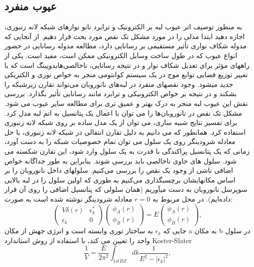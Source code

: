\subsection{عیوب منفرد} 
به منظور توصیف اثر عیوب لبه بر الکترونیک و ترابرد نانو نوارهای شبکه لانه زنبوری، اجازه دهید ابتدا مدلی را در مورد مشکل تک نقص مورد بحث قرار دهیم. از آنجایی که مدوله \gls{شکاف نواری} تأثیر مستقیمی بر رسانایی دارد، مطالعه مدوله رسانایی در حضور انواع عیوب که در طول ساخت وسایل الکترونیکی ممکن است، مفید است. یکی از راههای مؤثر برای تعدیل شکاف نوار و در نتیجه رسانایی، ناخالصی‌های\gls{دوپینگ} است که با تغییر توزیع فضایی توابع موج در یک سیستم کوانتومی منجر به خواص نوری و الکتریکی جدید میشود. وجود نقصهای منفرد در لبه‌های نانوروبان می‌تواند تقارن زیرشبکه را بشکند و در نتیجه بر خواص الکترونیکی و ترابرد مانند رسانایی تأثیر بگذارد. بررسی نقش این عیوب لبه منجر به درک بهتر و عمیق تری برای مطالعه سایر عیوب می شود. مشکل تک نقص در نانوروبان‌ها را می توان با اعمال یک پتانسیل به اتم لبه مدل کرد. برای تفسیر نتایج شبیه سازی، می توان از یک مدل ساده بر روی شبکه لانه زنبوری استفاده کرد. همانطور که می دانیم به دلیل تقارن انتقالی در شبکه لانه زنبوری، با حل معادله شرودینگر روی یک سلول می توان تمام خصوصیات شبکه را به دست آورد، زمانی که یک پتانسیل پراکندگی با قدرت  به یک سلول وارد شود، این تقارن شکسته می شود. سلول های حاوی ناخالصی باید بررسی شوند. بنابراین به طور جداگانه خواص اضافی ناشی از وجود یک نقص را بررسی می‌کنیم. سلولهای داخل نانوروبان را بر اساس مکانهایشان برچسبگذاری می‌کنیم به طوری که اولین سلول را در لبه بالایی سوپرسل نانوروبان به دست میآوریم (همان سلولی که پتانسیل اضافی را روی آن قرار داده‌ایم). در محل مربوط به $r = 0$ معادله شرودینگر نوشته شده است به صورت:
\begin{equation}
  \left(
  \begin{array}{cc}
    V\delta(r)&\epsilon^{*}_{k}\\
    \epsilon_k & 0
  \end{array}
  \right)
  \left(
  \begin{array}{c}
    \phi_{A}(r)\\
    \phi_{B}(r)
  \end{array}
  \right)
  =E
  \left(
  \begin{array}{c}
    \phi_{A}(r)\\
    \phi_{B}(r)
  \end{array}
  \right),
\end{equation}
جایی که $\epsilon_k$ به ساختار توری وابسته است و انرژی جهش از مکان a به مکان b در سلول واحد را تعیین می کند، با استفاده از روش استاندارد Koster-Slater%
\begin{equation}
  \frac{1}{V}=\frac{E}{2\pi^2}\int_{1st BZ}dk\frac{1}{E^2-|\epsilon_k|^2},
  \label{virtual}
\end{equation}

